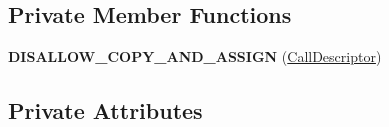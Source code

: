 \subsection*{Private Member Functions}
\begin{DoxyCompactItemize}
\item 
{\bfseries D\+I\+S\+A\+L\+L\+O\+W\+\_\+\+C\+O\+P\+Y\+\_\+\+A\+N\+D\+\_\+\+A\+S\+S\+I\+GN} (\hyperlink{classv8_1_1internal_1_1compiler_1_1_call_descriptor}{Call\+Descriptor})\hypertarget{classv8_1_1internal_1_1compiler_1_1_call_descriptor_ad2f35f6ba3e5da01799d2bdc3dc735c4}{}\label{classv8_1_1internal_1_1compiler_1_1_call_descriptor_ad2f35f6ba3e5da01799d2bdc3dc735c4}

\end{DoxyCompactItemize}
\subsection*{Private Attributes}
